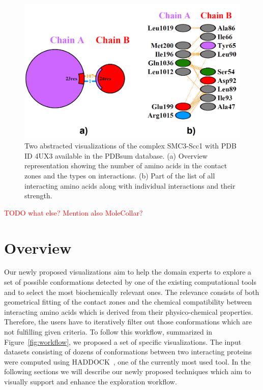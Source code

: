 \documentclass[journal]{vgtc}                %
\begin{document}
\begin{figure}[bt]
  \centering
  \includegraphics[width=1.0\columnwidth]{pdbsum.png}
  \caption{Two abstracted visualizations of the complex SMC3-Scc1 with PDB ID 4UX3 available in the PDBsum database. (a) Overview representation showing the number of amino acids in the contact zones and the types on interactions. (b) Part of the list of all interacting amino acids along with individual interactions and their strength.}
  \label{fig:pdbsum}
\end{figure}

\textcolor{red}{TODO what else? Mention also MoleCollar?}

\section{Overview}
Our newly proposed visualizations aim to help the domain experts to explore a set of possible conformations detected by one of the existing computational tools and to select the most biochemically relevant ones.
The relevance consists of both geometrical fitting of the contact zones and the chemical compatibility between interacting amino acids which is derived from their physico-chemical properties.
Therefore, the users have to iteratively filter out those conformations which are not fulfilling given criteria.
To follow this workflow, summarized in Figure~\ref{fig:workflow}, we proposed a set of specific visualizations. 
The input datasets consisting of dozens of conformations between two interacting proteins were computed using HADDOCK~\cite{haddock}, one of the currently most used tool.
In the following sections we will describe our newly proposed techniques which aim to visually support and enhance the exploration workflow.
\end{document}
